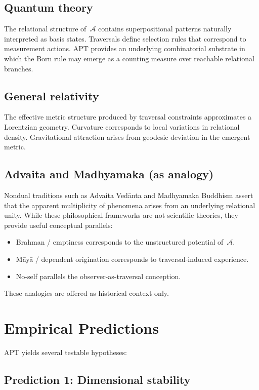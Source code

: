 \documentclass[12pt]{article}
\begin{document}
\subsection{Quantum theory}

The relational structure of~$\mathcal{A}$ contains superpositional
patterns naturally interpreted as basis states.
Traversals define selection rules that correspond to measurement
actions.
APT provides an underlying combinatorial substrate in which the Born
rule may emerge as a counting measure over reachable relational 
branches.

\subsection{General relativity}

The effective metric structure produced by traversal constraints 
approximates a Lorentzian geometry.
Curvature corresponds to local variations in relational density.
Gravitational attraction arises from geodesic deviation in the emergent
metric.

\subsection{Advaita and Madhyamaka (as analogy)}

Nondual traditions such as Advaita Vedānta and Madhyamaka Buddhism 
assert that the apparent multiplicity of phenomena arises from an 
underlying relational unity.
While these philosophical frameworks are not scientific theories, they 
provide useful conceptual parallels:
\begin{itemize}
    \item Brahman / emptiness corresponds to the unstructured potential 
    of~$\mathcal{A}$.
    \item Māyā / dependent origination corresponds to traversal-induced 
    experience.
    \item No-self parallels the observer-as-traversal conception.
\end{itemize}
These analogies are offered as historical context only.

\section{Empirical Predictions}

APT yields several testable hypotheses:

\subsection{Prediction 1: Dimensional stability}
\end{document}
